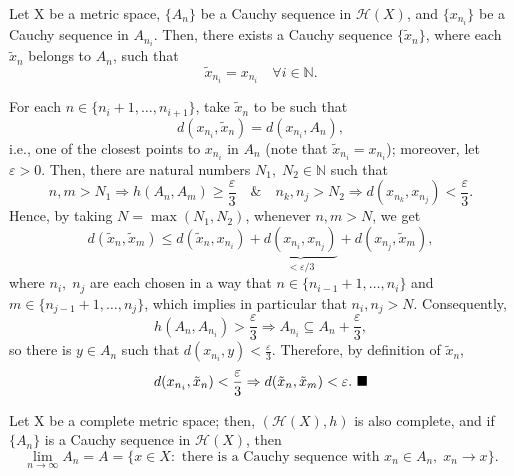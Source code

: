 \documentclass[../fractals_everywhere.tex]{subfiles}
\begin{document}
\begin{lemma*}
	Let X be a metric space, \(\{A_{n}\}\) be a Cauchy sequence in \(\mathcal{H}(X)\), and \(\{x_{n_{i}}\}\) be a Cauchy sequence in \(A_{n_{i}}\). Then, there exists a Cauchy sequence \(\{\tilde{x}_{n}\}\), where each \(\tilde{x}_{n}\) belongs to \(A_{n}\), such that
	\[
		\tilde{x}_{n_{i}} = x_{n_{i}} \quad \forall i\in \mathbb{N}.
	\]
\end{lemma*}
\begin{proof*}
	For each \(n\in\{n_{i}+1, \dotsc , n_{i+1}\}\), take \(\tilde{x}_{n}\) to be such that
	\[
		d(x_{n_{i}}, \tilde{x}_{n})=d(x_{n_{i}}, A_{n}),
	\]
	i.e., one of the closest points to \(x_{n_{i}}\) in \(A_{n}\) (note that \(\tilde{x}_{n_{i}}=x_{n_{i}}\)); moreover, let \(\varepsilon  > 0\). Then, there are natural numbers \(N_{1},\; N_{2}\in \mathbb{N}\) such that
	\[
		n, m > N_{1} \Rightarrow h(A_{n}, A_{m})\geq \frac{\varepsilon }{3} \quad\&\quad n_{k}, n_{j}>N_2 \Rightarrow d(x_{n_{k}}, x_{n_{j}})<\frac{\varepsilon }{3}.
	\]
	Hence, by taking \(N = \max\limits_{}(N_1, N_2)\), whenever \(n, m>N\), we get
	\[
		d(\tilde{x}_{n}, \tilde{x}_{m})\leq d(\tilde{x}_{n}, x_{n_{i}}) + \underbrace{d(x_{n_{i}}, x_{n_{j}})}_{< \varepsilon/3} + d(x_{n_{j}}, \tilde{x}_{m}),
	\]
	where \(n_{i},\; n_{j}\) are each chosen in a way that \(n\in \{n_{i-1}+1, \dotsc , n_{i}\}\) and \(m\in \{n_{j-1}+1, \dotsc , n_{j}\}\), which implies in particular that \(n_{i}, n_{j}> N\). Consequently,
	\[
		h(A_{n}, A_{n_{i}})>\frac{\varepsilon }{3}\Rightarrow A_{n_{i}}\subseteq A_{n} + \frac{\varepsilon }{3},
	\]
	so there is \(y\in A_{n}\) such that \(d(x_{n_{i}}, y)<\frac{\varepsilon }{3}\). Therefore, by definition of \(\tilde{x}_{n}\),
	\[
		d(x_{n_{i}}, \tilde{x}_{n}) < \frac{\varepsilon }{3} \Rightarrow d(\tilde{x}_{n}, \tilde{x}_{m}) < \varepsilon. \text{ $\blacksquare$}
	\]
\end{proof*}
\begin{theorem*}
	Let X be a complete metric space; then, \((\mathcal{H}(X), h)\) is also complete, and if \(\{A_{n}\}\) is a Cauchy sequence in \(\mathcal{H}(X)\), then
	\[
		\lim_{n\to \infty}A_{n} = A = \{x\in X: \text{ there is a Cauchy sequence with }x_{n}\in A_{n},\; x_{n}\rightarrow x\}.
	\]
\end{theorem*}
\end{document}
